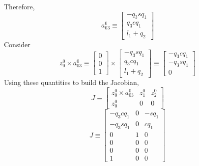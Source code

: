 \documentclass[12pt]{article}
\begin{document}
Therefore,
\[
  a_{03}^0 \equiv
  \begin{bmatrix}
    -q_3sq_1 \\
    q_3cq_1 \\
    l_1 + q_2
  \end{bmatrix}
\]
Consider
\[
  z_0^0 \times a_{03}^0 \equiv
  \begin{bmatrix}
    0 \\
    0 \\
    1
  \end{bmatrix}
  \times
  \begin{bmatrix}
    -q_3sq_1 \\
    q_3cq_1 \\
    l_1 + q_2
  \end{bmatrix}
  \equiv
  \begin{bmatrix}
    -q_3cq_1 \\
    -q_3sq_1 \\
    0
  \end{bmatrix}
\]
Using these quantities to build the Jacobian,
\[
  J \equiv
  \begin{bmatrix}
    z_0^0 \times a_{03}^0 & z_1^0 & z_2^0 \\
    z_0^0 & 0 & 0
  \end{bmatrix}
\]
\[
  J \equiv
  \begin{bmatrix}
    -q_3cq_1 & 0 & -sq_1 \\
    -q_3sq_1 & 0 &  cq_1 \\
    0        & 1 &  0 \\
    0 & 0 & 0 \\
    0 & 0 & 0 \\
    1 & 0 & 0
  \end{bmatrix}
\]
\end{document}

